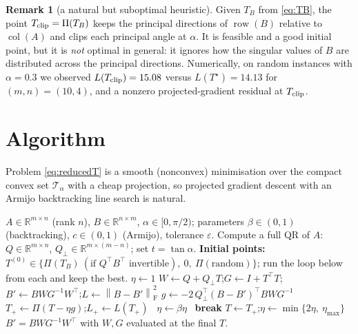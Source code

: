 \documentclass[11pt]{article}
\theoremstyle{definition}
\newtheorem{remark}[theorem]{Remark}
\newcommand{\R}{\mathbb{R}}
\newcommand{\col}{\operatorname{col}}
\newcommand{\row}{\operatorname{row}}
\newcommand{\norm}[1]{\left\lVert #1 \right\rVert}
\newcommand{\Fro}{\mathrm{F}}
\newcommand{\Qp}{Q_{\perp}}
\newcommand{\Pop}{\Pi}
\newcommand{\Tf}{\mathcal{T}}
\begin{document}
\begin{remark}[a natural but suboptimal heuristic]\label{rem:clip}
Given $T_B$ from \eqref{eq:TB}, the point $T_{\rm clip}=\Pop(T_B)$ keeps the principal directions of $\row(B)$ relative to $\col(A)$ and clips each principal angle at $\alpha$. It is feasible and a good initial point, but it is \emph{not} optimal in general: it ignores how the singular values of $B$ are distributed across the principal directions. Numerically, on random instances with $\alpha=0.3$ we observed $L(T_{\rm clip})=15.08$ versus $L(T^\star)=14.13$ for $(m,n)=(10,4)$, and a nonzero projected-gradient residual at $T_{\rm clip}$.
\end{remark}

\section{Algorithm}

Problem \eqref{eq:reducedT} is a smooth (nonconvex) minimisation over the compact convex set $\Tf_\alpha$ with a cheap projection, so projected gradient descent with an Armijo backtracking line search is natural.

\begin{algorithm}[h]
\caption{Projected gradient for \eqref{eq:main}}
\label{alg:pg}
\begin{algorithmic}[1]
\Require $A\in\R^{m\times n}$ (rank $n$), $B\in\R^{n\times m}$, $\alpha\in[0,\pi/2)$; parameters $\beta\in(0,1)$ (backtracking), $c\in(0,1)$ (Armijo), tolerance $\varepsilon$.
\State Compute a full QR of $A$: $Q\in\R^{m\times n}$, $\Qp\in\R^{m\times(m-n)}$; set $t=\tan\alpha$.
\State \textbf{Initial points:} $T^{(0)}\in\{\Pop(T_B)\ (\text{if }Q^\top B^\top\text{ invertible}),\ 0,\ \Pop(\text{random})\}$; run the loop below from each and keep the best.
\State $\eta\gets 1$
\Loop
  \State $W\gets Q+\Qp T$;\quad $G\gets I+T^\top T$;\quad $B'\gets BWG^{-1}W^\top$;\quad $L\gets\norm{B-B'}_\Fro^2$
  \State $g\gets -2\,\Qp^\top(B-B')^\top BWG^{-1}$ 
  \Repeat {}
     \State $T_+\gets\Pop(T-\eta g)$;\quad $L_+\gets L(T_+)$
     \ $\eta\gets\beta\eta$ \EndIf
  \If{$\norm{T_+-T}_\Fro\le\varepsilon(1+\norm T_\Fro)$}\ \textbf{break} \EndIf
  \State $T\gets T_+$;\quad $\eta\gets\min\{2\eta,\ \eta_{\max}\}$
\EndLoop
\State \Return $B'=BWG^{-1}W^\top$ with $W,G$ evaluated at the final $T$.
\end{algorithmic}
\end{algorithm}
\end{document}
